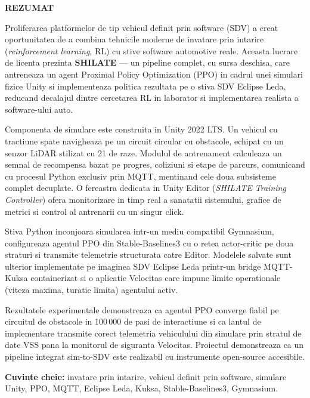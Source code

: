 \thispagestyle{abstractpagestyle}

\vspace*{36pt}

\begin{center}
    \textbf{\fontsize{20pt}{24pt} \selectfont REZUMAT}
\end{center}

\vspace{24pt}

Proliferarea platformelor de tip vehicul definit prin software (SDV) a creat
oportunitatea de a combina tehnicile moderne de invatare prin intarire
(\textit{reinforcement learning}, RL) cu stive software automotive reale.
Aceasta lucrare de licenta prezinta \textbf{SHILATE} --- un pipeline complet,
cu sursa deschisa, care antreneaza un agent Proximal Policy Optimization (PPO)
in cadrul unei simulari fizice Unity si implementeaza politica rezultata pe o
stiva SDV Eclipse Leda, reducand decalajul dintre cercetarea RL in laborator
si implementarea realista a software-ului auto.

Componenta de simulare este construita in Unity 2022 LTS. Un vehicul cu
tractiune spate navigheaza pe un circuit circular cu obstacole, echipat cu un
senzor LiDAR stilizat cu 21 de raze. Modulul de antrenament calculeaza un
semnal de recompensa bazat pe progres, coliziuni si etape de parcurs,
comunicand cu procesul Python exclusiv prin MQTT, mentinand cele doua
subsisteme complet decuplate. O fereastra dedicata in Unity Editor
(\textit{SHILATE Training Controller}) ofera monitorizare in timp real a
sanatatii sistemului, grafice de metrici si control al antrenarii cu un
singur click.

Stiva Python inconjoara simularea intr-un mediu compatibil Gymnasium,
configureaza agentul PPO din Stable-Baselines3 cu o retea actor-critic pe
doua straturi si transmite telemetrie structurata catre Editor. Modelele
salvate sunt ulterior implementate pe imaginea SDV Eclipse Leda printr-un
bridge MQTT-Kuksa containerizat si o aplicatie Velocitas care impune limite
operationale (viteza maxima, turatie limita) agentului activ.

Rezultatele experimentale demonstreaza ca agentul PPO converge fiabil pe
circuitul de obstacole in 100\,000 de pasi de interactiune si ca lantul de
implementare transmite corect telemetria vehiculului din simulare prin stratul
de date VSS pana la monitorul de siguranta Velocitas. Proiectul demonstreaza
ca un pipeline integrat sim-to-SDV este realizabil cu instrumente open-source
accesibile.

\textbf{Cuvinte cheie:} invatare prin intarire, vehicul definit prin software,
simulare Unity, PPO, MQTT, Eclipse Leda, Kuksa, Stable-Baselines3, Gymnasium.

\vfill
